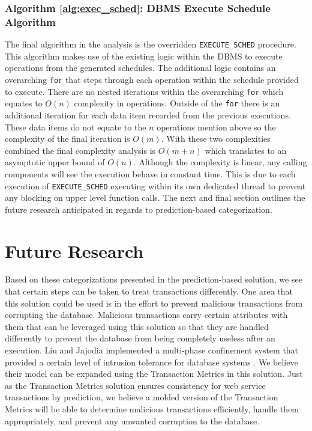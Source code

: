 \documentclass[conference]{IEEEtran}
\begin{document}
\subsubsection{Algorithm \ref{alg:exec_sched}: DBMS Execute Schedule Algorithm}
\label{alg_complexity:exec_sched}
The final algorithm in the analysis is the overridden \verb|EXECUTE_SCHED| procedure. This algorithm makes use of the existing logic within the DBMS to execute operations from the generated schedules. The additional logic contains an overarching \verb|for| that steps through each operation within the schedule provided to execute. There are no nested iterations within the overarching \verb|for| which equates to $O(n)$ complexity in operations. Outside of the \verb|for| there is an additional iteration for each data item recorded from the previous executions. These data items do not equate to the $n$ operations mention above so the complexity of the final iteration is $O(m)$. With these two complexities combined the final complexity analysis is $O(m+n)$ which translates to an asymptotic upper bound of $O(n)$. Although the complexity is linear, any calling components will see the execution behave in constant time. This is due to each execution of \verb|EXECUTE_SCHED| executing within its own dedicated thread to prevent any blocking on upper level function calls. The next and final section outlines the future research anticipated in regards to prediction-based categorization.

\section{Future Research}
\label{sec:future_research}
Based on these categorizations presented in the prediction-based solution, we see that certain steps can be taken to treat transactions differently. One area that this solution could be used is in the effort to prevent malicious transactions from corrupting the database. Malicious transactions carry certain attributes with them that can be leveraged using this solution so that they are handled differently to prevent the database from being completely useless after an execution. Liu and Jajodia implemented a multi-phase confinement system that provided a certain level of intrusion tolerance for database systems \cite{Liu_Intrusion}. We believe their model can be expanded using the Transaction Metrics in this solution. Just as the Transaction Metrics solution ensures consistency for web service transactions by prediction, we believe a molded version of the Transaction Metrics will be able to determine malicious transactions efficiently, handle them appropriately, and prevent any unwanted corruption to the database.
\end{document}
